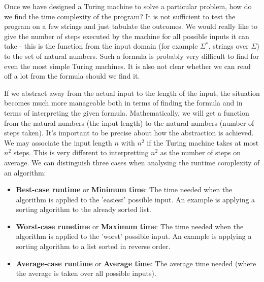 \documentclass[11pt]{article}
\begin{document}
	\par 
	Once we have designed a Turing machine to solve a particular problem, how do we find the time complexity of the program? It is not sufficient to test the program on a few strings and just tabulate the outcomes. We would really like to give the number of steps executed by the machine for all possible inputs it can take - this is the function from the input domain (for example $\Sigma^{*}$, strings over $\Sigma$) to the set of natural numbers. Such a formula is probably very difficult to find for even the most simple Turing machines. It is also not clear whether we can read off a lot from the formula should we find it.
	
	\par If we abstract away from the actual input to the length of the input, the situation becomes much more manageable both in terms of finding the formula and in terms of interpreting the given formula. Mathematically, we will get a function from the natural numbers (the input length) to the natural numbers (number of steps taken). It's important to be precise about how the abstraction is achieved. We may associate the input length $n$ with $n^{2}$ if the Turing machine takes at most $n^{2}$ steps. This is very different to interpretting $n^{2}$ as the number of steps on average. We can distinguish three cases when analysing the runtime complexity of an algorithm:
	\begin{itemize}
		\item \textbf{Best-case runtime} or \textbf{Minimum time}: The time needed when the algorithm is applied to the 'easiest' possible input. An example is applying a sorting algorithm to the already sorted list.
		\item \textbf{Worst-case runetime} or \textbf{Maximum time}: The time needed when the algorithm is applied to the 'worst' possible input. An example is applying a sorting algorithm to a list sorted in reverse order.
		\item \textbf{Average-case runtime} or \textbf{Average time}: The average time needed (where the average is taken over all possible inputs).
	\end{itemize}
	
\end{document}
